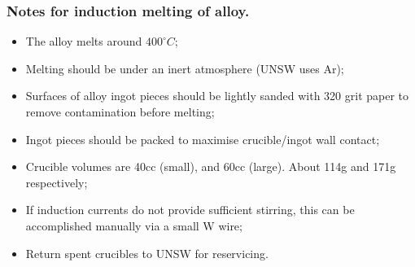 \subsubsection{Notes for induction melting of \MgZnCa alloy.}
\begin{itemize}
\item The \MgZnCa alloy melts around $400^{\circ}C$;
\item Melting should be under an inert atmosphere (UNSW uses Ar);
\item Surfaces of alloy ingot pieces should be lightly sanded with 320 grit paper to remove contamination before melting;
\item Ingot pieces should be packed to maximise crucible/ingot wall contact;
\item Crucible volumes are 40cc (small), and 60cc (large). About 114g and 171g respectively;
\item If induction currents do not provide sufficient stirring, this can be accomplished manually via a small W wire; 
\item Return spent crucibles to UNSW for reservicing. 
\end{itemize}